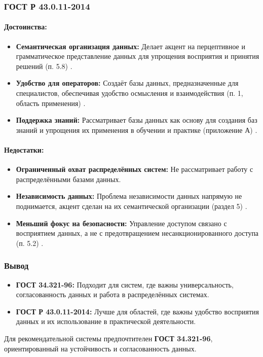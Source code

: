 \subsubsection*{ГОСТ Р 43.0.11-2014}

\paragraph{Достоинства:}
\begin{itemize}
    \item \textbf{Семантическая организация данных:} Делает акцент на перцептивное и грамматическое представление данных для упрощения восприятия и принятия решений (п. 5.8) \cite[п. 5.8]{ГОСТ43}.
    \item \textbf{Удобство для операторов:} Создаёт базы данных, предназначенные для специалистов, обеспечивая удобство осмысления и взаимодействия (п. 1, область применения) \cite[п. 1]{ГОСТ43}.
    \item \textbf{Поддержка знаний:} Рассматривает базы данных как основу для создания баз знаний и упрощения их применения в обучении и практике (приложение А) \cite[приложение А]{ГОСТ43}.
\end{itemize}

\paragraph{Недостатки:}
\begin{itemize}
    \item \textbf{Ограниченный охват распределённых систем:} Не рассматривает работу с распределёнными базами данных.
    \item \textbf{Независимость данных:} Проблема независимости данных напрямую не поднимается, акцент сделан на их семантической организации (раздел 5) \cite[раздел 5]{ГОСТ43}.
    \item \textbf{Меньший фокус на безопасности:} Управление доступом связано с восприятием данных, а не с предотвращением несанкционированного доступа (п. 5.2) \cite[п. 5.2]{ГОСТ43}.
\end{itemize}

\subsubsection*{Вывод}
\begin{itemize}
    \item \textbf{ГОСТ 34.321-96:} Подходит для систем, где важны универсальность, согласованность данных и работа в распределённых системах.
    \item \textbf{ГОСТ Р 43.0.11-2014:} Лучше для областей, где важны удобство восприятия данных и их использование в практической деятельности.
\end{itemize}
Для рекомендательной системы предпочтителен \textbf{ГОСТ 34.321-96}, ориентированный на устойчивость и согласованность данных.
